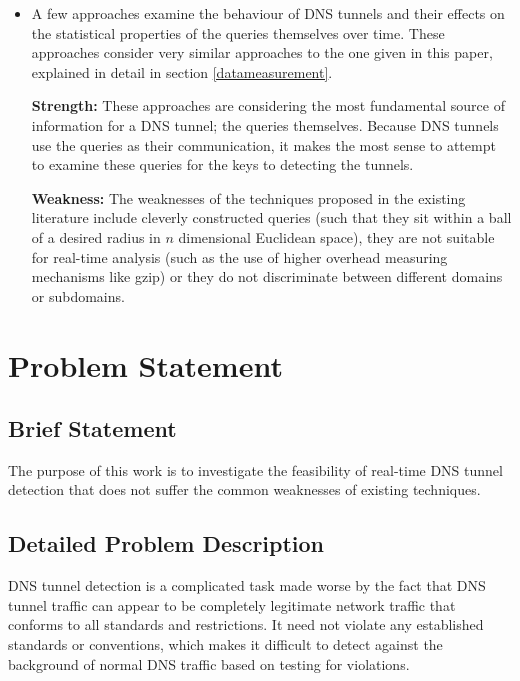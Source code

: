 \documentclass[12pt]{article}
\theoremstyle{remark}
\theoremstyle{definition}
\theoremstyle{definition}
\theoremstyle{definition}
\begin{document}
\begin{itemize}
\item A few approaches examine the behaviour of DNS tunnels and their effects on
the statistical properties of the queries themselves over time. These approaches
consider very similar approaches to the one given in this paper, explained in
detail in section \ref{datameasurement}.

\textbf{Strength:} These approaches are considering the most fundamental source
of information for a DNS tunnel; the queries themselves. Because DNS tunnels use
the queries as their communication, it makes the most sense to attempt to
examine these queries for the keys to detecting the tunnels.

\textbf{Weakness:} The weaknesses of the techniques proposed in the existing
literature include cleverly constructed queries (such that they sit within a
ball of a desired radius in $n$ dimensional Euclidean space), they are not
suitable for real-time analysis (such as the use of higher overhead measuring
mechanisms like gzip) or they do not discriminate between different domains
or subdomains.
\end{itemize}

\newpage
\section{Problem Statement}

\subsection{Brief Statement}
\label{briefproblem}
The purpose of this work is to investigate the feasibility of real-time DNS tunnel detection that does not suffer the common weaknesses of existing techniques.

\subsection{Detailed Problem Description}
DNS tunnel detection is a complicated task made worse by the fact that DNS
tunnel traffic can appear to be completely legitimate network traffic that
conforms to all standards and restrictions. It
need not violate any established standards or conventions, which makes it
difficult to detect against the background of normal DNS traffic based on
testing for violations.
\end{document}
